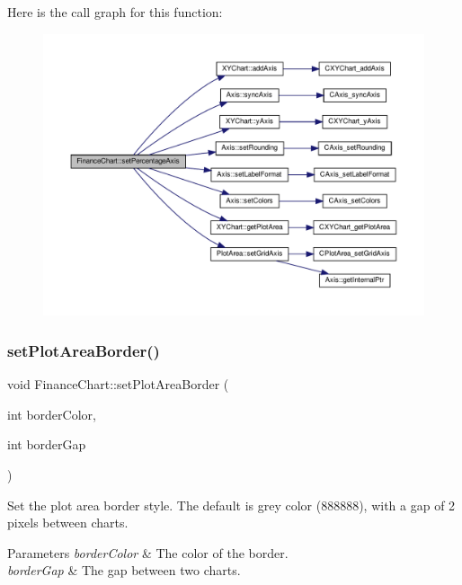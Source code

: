 Here is the call graph for this function\+:
\nopagebreak
\begin{figure}[H]
\begin{center}
\leavevmode
\includegraphics[width=350pt]{class_finance_chart_aae20ef522feef3ab61e8b8639c15275e_cgraph}
\end{center}
\end{figure}
\mbox{\label{class_finance_chart_a8bd04e96ef80bda7605b7797ec93f9d7}} 
\subsubsection{\texorpdfstring{set\+Plot\+Area\+Border()}{setPlotAreaBorder()}}
{\footnotesize\ttfamily void Finance\+Chart\+::set\+Plot\+Area\+Border (\begin{DoxyParamCaption}\item[{int}]{border\+Color,  }\item[{int}]{border\+Gap }\end{DoxyParamCaption})\hspace{0.3cm}{\ttfamily [inline]}}



Set the plot area border style. The default is grey color (888888), with a gap of 2 pixels between charts. 


\begin{DoxyParams}{Parameters}
{\em border\+Color} & The color of the border.\\
\hline
{\em border\+Gap} & The gap between two charts.\\
\hline
\end{DoxyParams}


